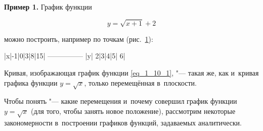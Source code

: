 \textbf{Пример 1.} График функции

\begin{equation}\label{eq_1_10_1}
y = \sqrt{x+1} + 2
\end{equation}

можно построить, например по точкам (рис.\ \ref{fig_1_10_19}):

|x|-1|0|3|8|15|
---------------
|y| 2|3|4|5| 6|

\begin{figure}\label{fig_1_10_19}
\end{figure}

Кривая, изображающая график функции \eqref{eq_1_10_1}, "--- такая же, как и~кривая графика
функции $y = \sqrt{x}$, только перемещённая в~плоскости.

Чтобы понять "--- какие перемещения и~почему совершил график функции $y = \sqrt{x}$
(для того, чтобы занять новое положение), рассмотрим некоторые закономерности
в~построении графиков функций, задаваемых аналитически.
